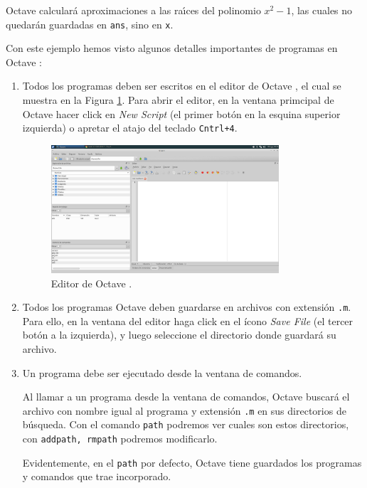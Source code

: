 \documentclass[letter,11pt]{article}
\newcommand\0{\mathbf{0}}
\newcommand{\octave}{{\sc Octave }}
\begin{document}
\octave calcular\'a aproximaciones a las ra\'{\i}ces del polinomio $x^2-1$,
las cuales no quedar\'an guardadas en \Verb+ans+, sino en \Verb+x+.

Con este ejemplo hemos visto algunos detalles importantes de programas en \octave:

\begin{enumerate}			
\item Todos los programas deben ser escritos en el editor de \octave, el cual se muestra en la Figura \ref{fig:editor}. Para abrir el editor, en la ventana primcipal de \octave{} hacer click en \emph{New Script} (el primer bot\'on en la esquina superior izquierda) o apretar el atajo del teclado \verb"Cntrl+4". 

\begin{figure}[h]
\centering
\includegraphics[width=0.8\textwidth]{editor_octave.png}
\caption{Editor de \octave.}\label{fig:editor}
\end{figure}

\item Todos los programas \octave deben guardarse en archivos con extensi\'on \Verb+.m+. Para ello, en la ventana del editor haga click en el \'icono \emph{Save File} (el tercer bot\'on a la izquierda), y luego seleccione el directorio donde guardar\'a su archivo.

\item Un programa debe ser ejecutado desde la ventana de comandos.

Al llamar a un programa desde la ventana de comandos, \octave buscar\'a el archivo con nombre igual al programa y extensi\'on \Verb+.m+ en sus directorios de b\'usqueda. Con el comando \Verb+path+ podremos ver cuales son estos directorios, con \Verb+addpath, rmpath+ podremos modificarlo.

Evidentemente, en el \verb"path" por defecto, \octave{} tiene guardados los programas y comandos que trae incorporado. 


\end{enumerate}
\end{document}
